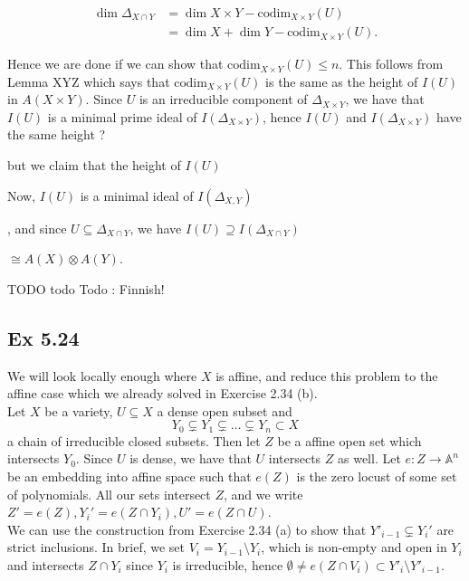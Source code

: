 \documentclass{article}
\theoremstyle{definition}
\newcommand{\A}{\mathbb{A}}
\newcommand{\An}{\A^n}
\newcommand{\codim}{\text{codim}}
\begin{document}
\begin{align*}
	\dim \Delta_{X \cap Y} 
	&=
	\dim X \times Y
	- 
	\codim_{X \times Y}(U) \\
	&=
	\dim X 
	+ 
	\dim Y
	-
	\codim_{X \times Y}(U).
\end{align*} 

Hence we are done if we can show that $\codim_{X \times Y}(U) \leq n$. This
follows from Lemma XYZ which says that $\codim_{X \times Y}(U)$ is the same as
the height of $I(U)$ in $A(X \times Y)$. Since $U$ is an irreducible component
of $\Delta_{X \times Y}$, we have that $I(U)$ is a minimal prime ideal of
$I(\Delta_{X \times Y})$, hence $I(U)$ and $I(\Delta_{X \times Y})$ have the
same height ? 

but we claim that the height of $I(U)$

Now, $I(U)$ is a minimal ideal of
$I(\Delta_{X, Y})$


, and since $U \subseteq \Delta_{X \cap
Y}$, we have $I(U) \supseteq I(\Delta_{X \cap Y})$

$\cong A(X) \otimes A(Y)$.

TODO todo Todo : Finnish!

\subsection*{Ex 5.24}

We will look locally enough where $X$ is affine, and reduce this problem to the
affine case which we already solved in Exercise 2.34 (b). \\

Let $X$ be a variety, $U \subseteq X$ a dense open subset and 
\[
Y_0 \subsetneq Y_1 \subsetneq \ldots \subsetneq Y_n \subset X
\] 
a chain of irreducible closed subsets. Then let $Z$ be a affine open set which
intersects $Y_0$. Since $U$ is dense, we have that $U$ intersects $Z$ as well.
Let $e : Z \to \An$ be an embedding into affine space such that $e(Z)$ is the
zero locust of some set of polynomials. All our sets intersect $Z$, and we
write $Z' = e(Z), Y_i' = e(Z \cap Y_i), U' = e(Z \cap U)$. \\

We can use the construction from Exercise 2.34 (a) to show that $Y'_{i - 1}
\subsetneq Y_i'$ are strict inclusions. In brief, we set $V_i = Y_{i - 1}
\setminus Y_i$, which is non-empty and open in $Y_i$ and intersects $Z \cap
Y_i$ since $Y_i$ is irreducible, hence $\emptyset \not = e(Z \cap V_i) \subset Y'_i
\setminus Y'_{i - 1}$. \\
\end{document}

